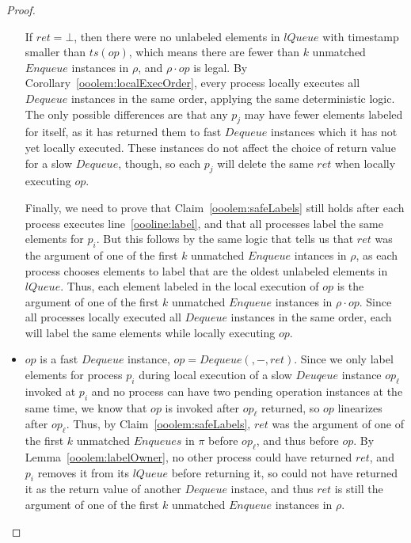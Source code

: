 \documentclass[a4paper,anonymous,USenglish]{lipics-v2021} %
\theoremstyle{definition}
\begin{document}
\begin{proof}
\begin{itemize}
    If $ret = \bot$, then there were no unlabeled elements in $lQueue$ with timestamp smaller than $ts(op)$, which means there are fewer than $k$ unmatched $Enqueue$ instances in $\rho$, and $\rho \cdot op$ is legal.  By Corollary~\ref{ooolem:localExecOrder}, every process locally executes all $Dequeue$ instances in the same order, applying the same deterministic logic.  The only possible differences are that any $p_j$ may have fewer elements labeled for itself, as it has returned them to fast $Dequeue$ instances which it has not yet locally executed.  These instances do not affect the choice of return value for a slow $Dequeue$, though, so each $p_j$ will delete the same $ret$ when locally executing $op$.  

    Finally, we need to prove that Claim~\ref{ooolem:safeLabels} still holds after each process executes line~\ref{oooline:label}, and that all processes label the same elements for $p_i$.  But this follows by the same logic that tells us that $ret$ was the argument of one of the first $k$ unmatched $Enqueue$ intances in $\rho$, as each process chooses elements to label that are the oldest unlabeled elements in $lQueue$.  Thus, each element labeled in the local execution of $op$ is the argument of one of the first $k$ unmatched $Enqueue$ instances in $\rho \cdot op$.  Since all processes locally executed all $Dequeue$ instances in the same order, each will label the same elements while locally executing $op$.
%
  \item $op$ is a fast $Dequeue$ instance, $op = Dequeue(,-,ret)$.  Since we only label elements for process $p_i$ during local execution of a slow $Deuqeue$ instance $op_\ell$ invoked at $p_i$ and no process can have two pending operation instances at the same time, we know that $op$ is invoked after $op_\ell$ returned, so $op$ linearizes after $op_\ell$.  Thus, by Claim~\ref{ooolem:safeLabels}, $ret$ was the argument of one of the first $k$ unmatched $Enqueues$ in $\pi$ before $op_\ell$, and thus before $op$.  By Lemma~\ref{ooolem:labelOwner}, no other process could have returned $ret$, and $p_i$ removes it from its $lQueue$ before returning it, so could not have returned it as the return value of another $Dequeue$ instace, and thus $ret$ is still the argument of one of the first $k$ unmatched $Enqueue$ instances in $\rho$.
  \end{itemize}
\end{proof}
\end{document}

